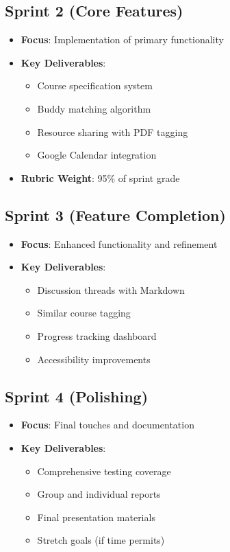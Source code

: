 \subsection{Sprint 2 (Core Features)}
\begin{itemize}
    \item \textbf{Focus}: Implementation of primary functionality
    \item \textbf{Key Deliverables}:
        \begin{itemize}
            \item Course specification system
            \item Buddy matching algorithm
            \item Resource sharing with PDF tagging
            \item Google Calendar integration
        \end{itemize}
    \item \textbf{Rubric Weight}: 95\% of sprint grade
\end{itemize}

\subsection{Sprint 3 (Feature Completion)}
\begin{itemize}
    \item \textbf{Focus}: Enhanced functionality and refinement
    \item \textbf{Key Deliverables}:
        \begin{itemize}
            \item Discussion threads with Markdown
            \item Similar course tagging
            \item Progress tracking dashboard
            \item Accessibility improvements
        \end{itemize}
\end{itemize}

\subsection{Sprint 4 (Polishing)}
\begin{itemize}
    \item \textbf{Focus}: Final touches and documentation
    \item \textbf{Key Deliverables}:
        \begin{itemize}
            \item Comprehensive testing coverage
            \item Group and individual reports
            \item Final presentation materials
            \item Stretch goals (if time permits)
        \end{itemize}
\end{itemize}

